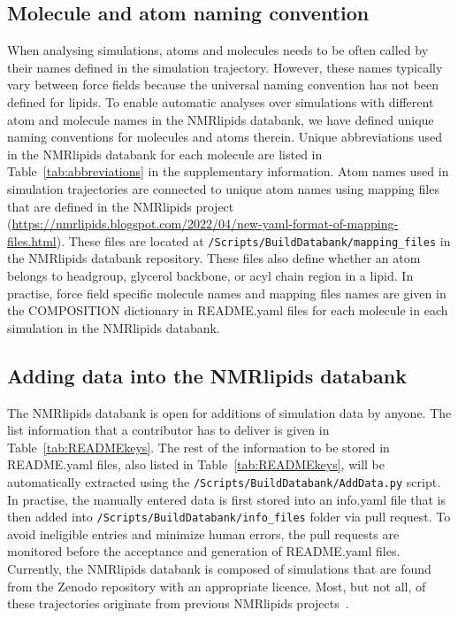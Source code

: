 \documentclass[fleqn,10pt]{wlscirep}
\begin{document}
\subsection{Molecule and atom naming convention} \label{naming}
When analysing simulations, atoms and molecules needs to be often called by their names defined in the simulation trajectory. However, these names typically vary between force fields because the universal naming convention has not been defined for lipids. To enable automatic analyses over simulations with different atom and molecule names in the NMRlipids databank, we have defined unique naming conventions for molecules and atoms therein. Unique abbreviations used in the NMRlipids databank for each molecule are listed in Table~\ref{tab:abbreviations} in the supplementary information. Atom names used in simulation trajectories are connected to unique atom names using mapping files that are defined in the NMRlipids project (\url{https://nmrlipids.blogspot.com/2022/04/new-yaml-format-of-mapping-files.html}). These files are located at \texttt{/Scripts/BuildDatabank/mapping\_files} in the NMRlipids databank repository. These files also define whether an atom belongs to headgroup, glycerol backbone, or acyl chain region in a lipid. In practise, force field specific molecule names and mapping files
names are given in the COMPOSITION dictionary in README.yaml files for each molecule in each simulation in the NMRlipids databank.

\subsection{Adding data into the NMRlipids databank}
The NMRlipids databank is open for additions of simulation data by anyone. The list information that a contributor has to deliver is given in Table~\ref{tab:READMEkeys}. The rest of the information to be stored in README.yaml files, also listed in Table~\ref{tab:READMEkeys}, will be automatically extracted using the \texttt{/Scripts/BuildDatabank/AddData.py} script. In practise, the manually entered data is first stored into an info.yaml file that is then added into \texttt{/Scripts/BuildDatabank/info\_files} folder via pull request. To avoid ineligible entries and minimize human errors, the pull requests are monitored before the acceptance and generation of README.yaml files.  Currently, the NMRlipids databank is composed of simulations that are found from the Zenodo repository with an appropriate licence. Most, but not all, of these trajectories originate from previous NMRlipids projects~\cite{botan15,catte16,antila19,bacle21}.
\end{document}
